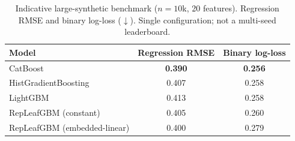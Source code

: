\documentclass[11pt]{article}
\begin{document}
\begin{table}[h]
\centering
\caption{Indicative large-synthetic benchmark ($n{=}10$k, 20 features). Regression RMSE and
binary log-loss ($\downarrow$). Single configuration; not a multi-seed leaderboard.}
\label{tab:synthetic}
\begin{tabular}{lcc}
\toprule
Model & Regression RMSE & Binary log-loss \\
\midrule
CatBoost                      & \textbf{0.390} & \textbf{0.256} \\
HistGradientBoosting          & 0.407 & 0.258 \\
LightGBM                      & 0.413 & 0.258 \\
RepLeafGBM (constant)         & 0.405 & 0.260 \\
RepLeafGBM (embedded-linear)  & 0.400 & 0.279 \\
\bottomrule
\end{tabular}
\end{table}



\end{document}
